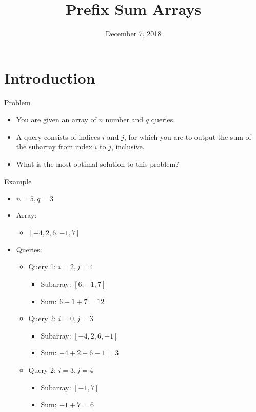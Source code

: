 \documentclass{beamer}
\title[Prefix Sum Arrays---Computer Science Club]{\textbf{Prefix Sum Arrays}}
\institute{Stephen Lewis Secondary School \\[3ex] {\large Computer Science Club}}
\date{December 7, 2018}
\begin{document}
\begin{frame} 
\titlepage 
\end{frame} 

\section{Introduction}

\begin{frame}{Problem}
\begin{itemize}
    \item You are given an array of $n$ number and $q$ queries.
    \item A query consists of indices $i$ and $j$, for which you are to output the sum of the subarray from index $i$ to $j$, inclusive.
    \item What is the most optimal solution to this problem?
\end{itemize}
\end{frame}

\begin{frame}{Example}
    \begin{itemize}
        \item $n = 5, q = 3$
        \item Array:
        \begin{itemize}
            \item $[-4, 2, 6, -1, 7]$
        \end{itemize}
        
        \item Queries:
        \begin{itemize}
            \item Query 1: $i = 2, j = 4$
            \begin{itemize}
                \item Subarray: $[6, -1, 7]$
                \item Sum: $6 - 1 + 7 = 12$
            \end{itemize}
            
            \item Query 2: $i = 0, j = 3$
            \begin{itemize}
                \item Subarray: $[-4, 2, 6, -1]$
                \item Sum: $-4 + 2 + 6 - 1 = 3$
            \end{itemize}
            
            \item Query 2: $i = 3, j = 4$
            \begin{itemize}
                \item Subarray: $[-1, 7]$
                \item Sum: $-1 + 7 = 6$
            \end{itemize}
        \end{itemize}
    \end{itemize}
\end{frame}
\end{document}
